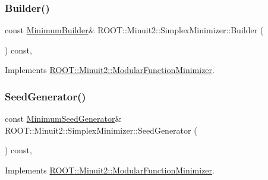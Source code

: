 \mbox{\label{classROOT_1_1Minuit2_1_1SimplexMinimizer_a388494c3f9b45ce6c5d91decef737608}} 
\subsubsection{\texorpdfstring{Builder()}{Builder()}\hspace{0.1cm}{\footnotesize\ttfamily [2/2]}}
{\footnotesize\ttfamily const \mbox{\hyperlink{classROOT_1_1Minuit2_1_1MinimumBuilder}{Minimum\+Builder}}\& R\+O\+O\+T\+::\+Minuit2\+::\+Simplex\+Minimizer\+::\+Builder (\begin{DoxyParamCaption}{ }\end{DoxyParamCaption}) const\hspace{0.3cm}{\ttfamily [inline]}, {\ttfamily [virtual]}}



Implements \mbox{\hyperlink{classROOT_1_1Minuit2_1_1ModularFunctionMinimizer_a13e98551cf14e927c61e1e34ecf8ba8b}{R\+O\+O\+T\+::\+Minuit2\+::\+Modular\+Function\+Minimizer}}.

\mbox{\label{classROOT_1_1Minuit2_1_1SimplexMinimizer_a7385d3ee5e4a48a796b11b51f7f0c408}} 
\subsubsection{\texorpdfstring{SeedGenerator()}{SeedGenerator()}\hspace{0.1cm}{\footnotesize\ttfamily [1/2]}}
{\footnotesize\ttfamily const \mbox{\hyperlink{classROOT_1_1Minuit2_1_1MinimumSeedGenerator}{Minimum\+Seed\+Generator}}\& R\+O\+O\+T\+::\+Minuit2\+::\+Simplex\+Minimizer\+::\+Seed\+Generator (\begin{DoxyParamCaption}{ }\end{DoxyParamCaption}) const\hspace{0.3cm}{\ttfamily [inline]}, {\ttfamily [virtual]}}



Implements \mbox{\hyperlink{classROOT_1_1Minuit2_1_1ModularFunctionMinimizer_a742930de97b0ce9ba23773874ae0894b}{R\+O\+O\+T\+::\+Minuit2\+::\+Modular\+Function\+Minimizer}}.

